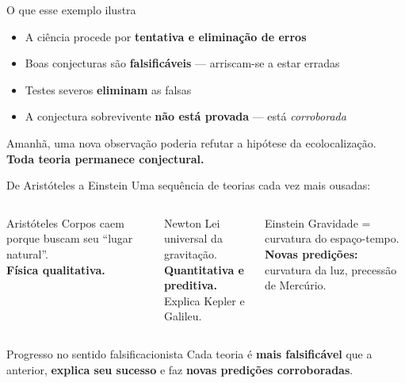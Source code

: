 \documentclass[aspectratio=169]{beamer}
\newcommand{\impt}[1]{\textcolor{maccent}{\textbf{#1}}}
\newcommand{\ntc}[1]{\textcolor{mprimary}{#1}}
\begin{document}
\begin{frame}{O que esse exemplo ilustra}
\begin{itemize}
  \item A ciência procede por \impt{tentativa e eliminação de erros}
  \pause
  \item Boas conjecturas são \impt{falsificáveis} --- arriscam-se a estar erradas
  \pause
  \item Testes severos \impt{eliminam} as falsas
  \pause
  \item A conjectura sobrevivente \impt{não está provada} --- está \emph{corroborada}
\end{itemize}
\pause
\vspace{0.4cm}
\begin{alertblock}{}
Amanhã, uma nova observação poderia refutar a hipótese da ecolocalização. \\
\impt{Toda teoria permanece conjectural.}
\end{alertblock}
\end{frame}

\begin{frame}{De Aristóteles a Einstein}
\ntc{Uma sequência de teorias cada vez mais ousadas:}
\vspace{0.4cm}
\begin{columns}[t]
\begin{block}{Aristóteles}
Corpos caem porque buscam seu ``lugar natural''.\\[0.2cm]
\impt{Física qualitativa.}
\end{block}

\pause
\begin{block}{Newton}
Lei universal da gravitação.\\[0.2cm]
\impt{Quantitativa e preditiva.}\\
Explica Kepler e Galileu.
\end{block}

\pause
\begin{block}{Einstein}
Gravidade = curvatura do espaço-tempo.\\[0.2cm]
\impt{Novas predições:} curvatura da luz, precessão de Mercúrio.
\end{block}
\end{columns}
\pause
\vspace{0.5cm}
\begin{alertblock}{Progresso no sentido falsificacionista}
Cada teoria é \impt{mais falsificável} que a anterior, \impt{explica seu sucesso} e faz \impt{novas predições corroboradas}.
\end{alertblock}
\end{frame}
\end{document}
